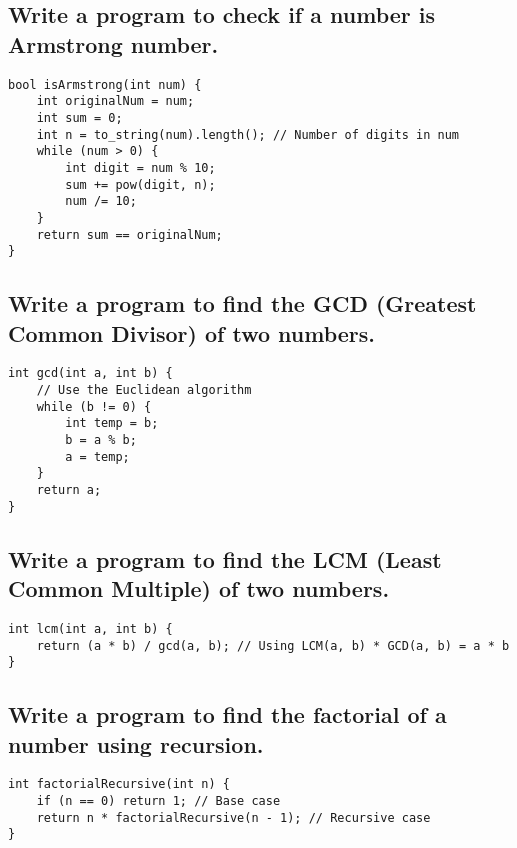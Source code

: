 \subsection{Write a program to check if a number is Armstrong number.}
\begin{tcolorbox}[title=]
\begin{verbatim}
bool isArmstrong(int num) {
    int originalNum = num;
    int sum = 0;
    int n = to_string(num).length(); // Number of digits in num
    while (num > 0) {
        int digit = num % 10;
        sum += pow(digit, n);
        num /= 10;
    }
    return sum == originalNum;
}
\end{verbatim}
\end{tcolorbox}


\subsection{Write a program to find the GCD (Greatest Common Divisor) of two numbers.}
\begin{tcolorbox}[title=]
\begin{verbatim}
int gcd(int a, int b) {
    // Use the Euclidean algorithm
    while (b != 0) {
        int temp = b;
        b = a % b;
        a = temp;
    }
    return a;
}
\end{verbatim}
\end{tcolorbox}


\subsection{Write a program to find the LCM (Least Common Multiple) of two numbers.}
\begin{tcolorbox}[title=]
\begin{verbatim}
int lcm(int a, int b) {
    return (a * b) / gcd(a, b); // Using LCM(a, b) * GCD(a, b) = a * b
}
\end{verbatim}
\end{tcolorbox}


\subsection{Write a program to find the factorial of a number using recursion.}
\begin{tcolorbox}[title=]
\begin{verbatim}
int factorialRecursive(int n) {
    if (n == 0) return 1; // Base case
    return n * factorialRecursive(n - 1); // Recursive case
}
\end{verbatim}
\end{tcolorbox}


